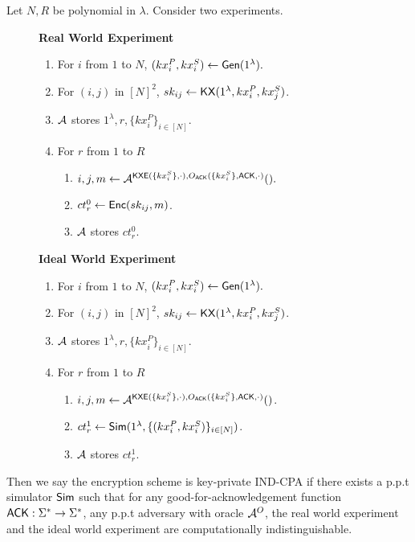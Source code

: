 \begin{definition}
\label{defn:sym-security}
Let $N, R$ be polynomial in $\lambda$. Consider two experiments.
\begin{figure}[h!]
\begin{framed}
\textbf{Real World Experiment}
\begin{enumerate}
    \item For $i$ from $1$ to $N$, $(kx_i^P, kx_i^S) \leftarrow \mathsf{Gen}(1^{\lambda}).$
    \item For $(i, j)$ in $[N]^2$, $sk_{ij} \leftarrow \mathsf{KX}(1^{\lambda}, kx_i^P, kx_j^S)$.
    \item $\mathcal{A}$ stores $1^{\lambda}, r, \{kx_i^P\}_{i \in [N]}$.
    \item For $r$ from $1$ to $R$
    \begin{enumerate}
        \item $i, j, m \leftarrow \mathcal{A}^{\mathsf{KXE}(\{kx_i^S\}, \cdot), O_{\mathsf{ACK}}(\{kx_i^S\}, \mathsf{ACK}, \cdot)}().$
        \item $ct^{0}_r \leftarrow \mathsf{Enc}(sk_{ij}, m)$.
        \item $\mathcal{A}$ stores $ct^{0}_r$.
    \end{enumerate}
\end{enumerate}
\textbf{Ideal World Experiment}
\begin{enumerate}
    \item For $i$ from $1$ to $N$, $(kx_i^P, kx_i^S) \leftarrow \mathsf{Gen}(1^{\lambda}).$
    \item For $(i, j)$ in $[N]^2$, $sk_{ij} \leftarrow \mathsf{KX}(1^{\lambda}, kx_i^P, kx_j^S)$.
    \item $\mathcal{A}$ stores $1^{\lambda}, r, \{kx_i^P\}_{i \in [N]}$.
    \item For $r$ from $1$ to $R$
    \begin{enumerate}
        \item $i, j, m \leftarrow \mathcal{A}^{\mathsf{KXE}(\{kx_i^S\}, \cdot), O_{\mathsf{ACK}}(\{kx_i^S\}, \mathsf{ACK}, \cdot)}()$.
        \item $ct^1_r \leftarrow \mathsf{Sim}(1^{\lambda}, \{(kx_i^P, kx_i^S)\}_{i \in [N]})$.
        \item $\mathcal{A}$ stores $ct^{1}_r$.
    \end{enumerate}
\end{enumerate}
\end{framed}
\end{figure}

Then we say the encryption scheme is key-private IND-CPA if there exists a p.p.t simulator $\mathsf{Sim}$ such that for any good-for-acknowledgement function $\mathsf{ACK}: \Sigma^* \to \Sigma^*$, any p.p.t adversary with oracle $\mathcal{A}^O$, the real world experiment and the ideal world experiment are computationally indistinguishable.
\end{definition}
